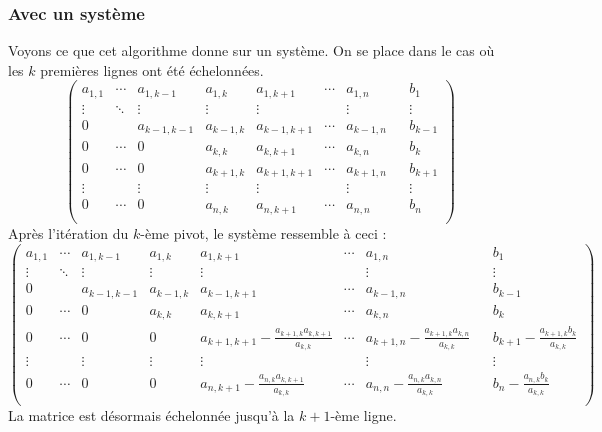 \documentclass[french]{article}
\begin{document}
\subsubsection{Avec un système}
Voyons ce que cet algorithme donne sur un système. On se place dans le cas où les $k$ premières lignes ont été échelonnées.
\begin{equation*}
	\begin{pmatrix}
		a_{1,1} & \cdots & a_{1,k-1} & a_{1,k} & a_{1,k+1} & \cdots & a_{1,n}&&b_1\\
		\vdots  & \ddots & \vdots & \vdots & \vdots & & \vdots&&\vdots\\
		0 & & a_{k-1,k-1} & a_{k-1,k} & a_{k-1,k+1} & \cdots & a_{k-1,n}&&b_{k-1}\\
		0 & \cdots & 0 & a_{k,k} & a_{k,k+1} & \cdots & a_{k,n}&&b_k\\
		0 & \cdots & 0 & a_{k+1,k} & a_{k+1,k+1} & \cdots & a_{k+1,n}&&b_{k+1}\\
		\vdots  & & \vdots & \vdots & \vdots & & \vdots&&\vdots\\
		0 & \cdots & 0 & a_{n,k} & a_{n,k+1} & \cdots & a_{n,n}&&b_n\\
	\end{pmatrix}
\end{equation*}
Après l'itération du $k$-ème pivot, le système ressemble à ceci :
\begin{equation*}
	\begin{pmatrix}
		a_{1,1} & \cdots & a_{1,k-1} & a_{1,k} & a_{1,k+1} & \cdots & a_{1,n}&&b_1\\
		\vdots  & \ddots & \vdots & \vdots & \vdots & & \vdots&&\vdots\\
		0 & & a_{k-1,k-1} & a_{k-1,k} & a_{k-1,k+1} & \cdots & a_{k-1,n}&&b_{k-1}\\
		0 & \cdots & 0 & a_{k,k} & a_{k,k+1} & \cdots & a_{k,n}&&b_k\\
		0 & \cdots & 0 & 0 & a_{k+1,k+1}-\frac{a_{k+1,k} a_{k,k+1}}{a_{k,k}} & \cdots & a_{k+1,n}-\frac{a_{k+1,k} a_{k,n}}{a_{k,k}}&&b_{k+1}-\frac{a_{k+1,k} b_k}{a_{k,k}}\\
		\vdots  & & \vdots & \vdots & \vdots & & \vdots&&\vdots\\
		0 & \cdots & 0 & 0 & a_{n,k+1}-\frac{a_{n,k} a_{k,k+1}}{a_{k,k}} & \cdots & a_{n,n}-\frac{a_{n,k} a_{k,n}}{a_{k,k}}&&b_n-\frac{a_{n,k} b_k}{a_{k,k}}\\
	\end{pmatrix}
\end{equation*}
La matrice est désormais échelonnée jusqu'à la $k+1$-ème ligne.
\end{document}
